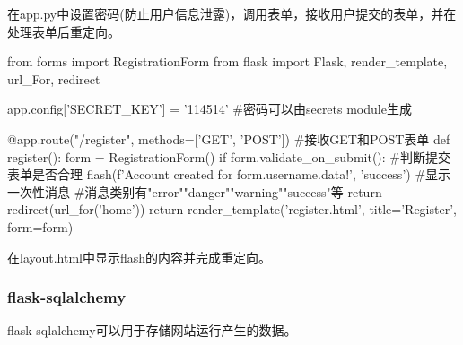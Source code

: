       在app.py中设置密码(防止用户信息泄露)，调用表单，接收用户提交的表单，并在处理表单后重定向。
      \begin{codeblock}[language=python, caption={Using forms in main.py}]
        from forms import RegistrationForm
        from flask import Flask, render_template, url_For, redirect

        app.config['SECRET_KEY'] = '114514' #密码可以由secrets module生成

        @app.route("/register", methods=['GET', 'POST']) #接收GET和POST表单
        def register():
            form = RegistrationForm()
            if form.validate_on_submit(): #判断提交表单是否合理
                flash(f'Account created for {form.username.data}!', 'success') #显示一次性消息
                    #消息类别有"error""danger""warning""success"等
                return redirect(url_for('home'))
            return render_template('register.html', title='Register', form=form)
      \end{codeblock}

      在layout.html中显示flash的内容并完成重定向。

    \subsubsection{flask-sqlalchemy}
      flask-sqlalchemy可以用于存储网站运行产生的数据。

